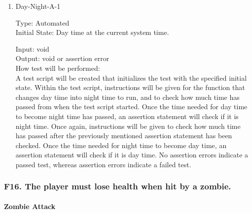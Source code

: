 \documentclass[12pt, titlepage]{article}
\newcounter{ftnum}
\begin{document}
\begin{enumerate}

\item{Day-Night-A-1\\}  \label{F15-1}

Type: Automated \\
					
Initial State: Day time at the current system time.
					
Input: void\\
					
Output: void or assertion error\\
					
How test will be performed:\\ A test script will be created that initializes the test with the specified initial state. Within the test script, instructions will be given for the function that changes day time into night time to run, and to check how much time has passed from when the test script started. Once the time needed for day time to become night time has passed, an assertion statement will check if it is night time. Once again, instructions will be given to check how much time has passed after the previously mentioned assertion statement has been checked. Once the time needed for night time to become day time, an assertion statement will check if it is day time. No assertion errors indicate a passed test, whereas assertion errors indicate a failed test.\\

\end{enumerate}

\subsubsection{{\color{magenta} F16.} The player must lose health when hit by a zombie.} 

\paragraph{Zombie Attack}
\end{document}
